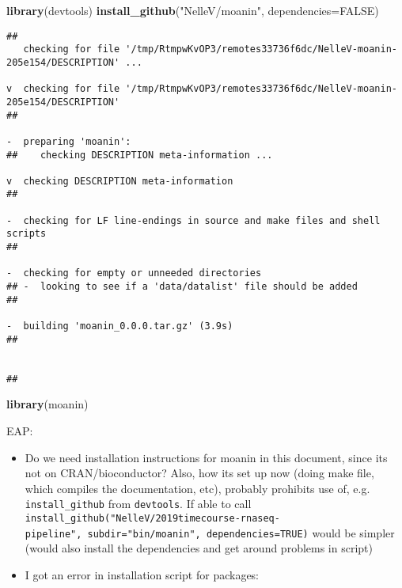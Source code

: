 \documentclass[9pt,a4paper,]{extarticle}
\newenvironment{Shaded}{\begin{snugshade}}{\end{snugshade}}
\newcommand{\DataTypeTok}[1]{\textcolor[rgb]{0.13,0.29,0.53}{#1}}
\newcommand{\KeywordTok}[1]{\textcolor[rgb]{0.13,0.29,0.53}{\textbf{#1}}}
\newcommand{\NormalTok}[1]{#1}
\newcommand{\OtherTok}[1]{\textcolor[rgb]{0.56,0.35,0.01}{#1}}
\newcommand{\StringTok}[1]{\textcolor[rgb]{0.31,0.60,0.02}{#1}}
\begin{document}
\begin{Shaded}
\begin{Highlighting}[]
\KeywordTok{library}\NormalTok{(devtools)}
\KeywordTok{install_github}\NormalTok{(}\StringTok{"NelleV/moanin"}\NormalTok{, }\DataTypeTok{dependencies=}\OtherTok{FALSE}\NormalTok{)}
\end{Highlighting}
\end{Shaded}

\begin{verbatim}
##   
   checking for file '/tmp/RtmpwKvOP3/remotes33736f6dc/NelleV-moanin-205e154/DESCRIPTION' ...
  
v  checking for file '/tmp/RtmpwKvOP3/remotes33736f6dc/NelleV-moanin-205e154/DESCRIPTION'
## 
  
-  preparing 'moanin':
##    checking DESCRIPTION meta-information ...
  
v  checking DESCRIPTION meta-information
## 
  
-  checking for LF line-endings in source and make files and shell scripts
## 
  
-  checking for empty or unneeded directories
## -  looking to see if a 'data/datalist' file should be added
## 
  
-  building 'moanin_0.0.0.tar.gz' (3.9s)
## 
  
   
## 
\end{verbatim}

\begin{Shaded}
\begin{Highlighting}[]
\KeywordTok{library}\NormalTok{(moanin)}
\end{Highlighting}
\end{Shaded}

EAP:

\begin{itemize}
\tightlist
\item
  Do we need installation instructions for moanin in this document, since its
  not on CRAN/bioconductor? Also, how its set up now (doing make file, which
  compiles the documentation, etc), probably prohibits use of, e.g.
  \texttt{install\_github} from \texttt{devtools}. If able to call
  \texttt{install\_github("NelleV/2019timecourse-rnaseq-pipeline",\ subdir="bin/moanin",\ dependencies=TRUE)} would be simpler (would also
  install the dependencies and get around problems in script)
\item
  I got an error in installation script for packages:
\end{itemize}
\end{document}
